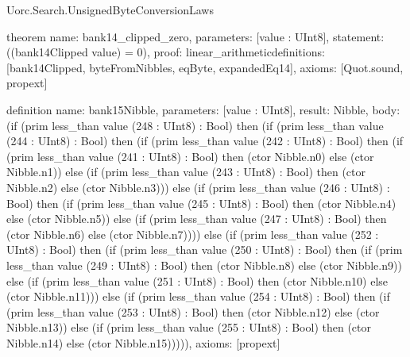 \begin{lexlean}{Uorc.Search.UnsignedByteConversionLaws}
\begin{semanticmodule}
theorem{
  name: bank14_clipped_zero,
  parameters: [value : UInt8],
  statement: ((bank14Clipped value) = 0),
  proof: linear_arithmetic{definitions: [bank14Clipped, byteFromNibbles, eqByte, expandedEq14]},
  axioms: [Quot.sound, propext]
}

definition{
  name: bank15Nibble,
  parameters: [value : UInt8],
  result: Nibble,
  body: (if (prim less_than value (248 : UInt8) : Bool) then (if (prim less_than value (244 : UInt8) : Bool) then (if (prim less_than value (242 : UInt8) : Bool) then (if (prim less_than value (241 : UInt8) : Bool) then (ctor Nibble.n0) else (ctor Nibble.n1)) else (if (prim less_than value (243 : UInt8) : Bool) then (ctor Nibble.n2) else (ctor Nibble.n3))) else (if (prim less_than value (246 : UInt8) : Bool) then (if (prim less_than value (245 : UInt8) : Bool) then (ctor Nibble.n4) else (ctor Nibble.n5)) else (if (prim less_than value (247 : UInt8) : Bool) then (ctor Nibble.n6) else (ctor Nibble.n7)))) else (if (prim less_than value (252 : UInt8) : Bool) then (if (prim less_than value (250 : UInt8) : Bool) then (if (prim less_than value (249 : UInt8) : Bool) then (ctor Nibble.n8) else (ctor Nibble.n9)) else (if (prim less_than value (251 : UInt8) : Bool) then (ctor Nibble.n10) else (ctor Nibble.n11))) else (if (prim less_than value (254 : UInt8) : Bool) then (if (prim less_than value (253 : UInt8) : Bool) then (ctor Nibble.n12) else (ctor Nibble.n13)) else (if (prim less_than value (255 : UInt8) : Bool) then (ctor Nibble.n14) else (ctor Nibble.n15))))),
  axioms: [propext]
}


\end{semanticmodule}
\end{lexlean}

